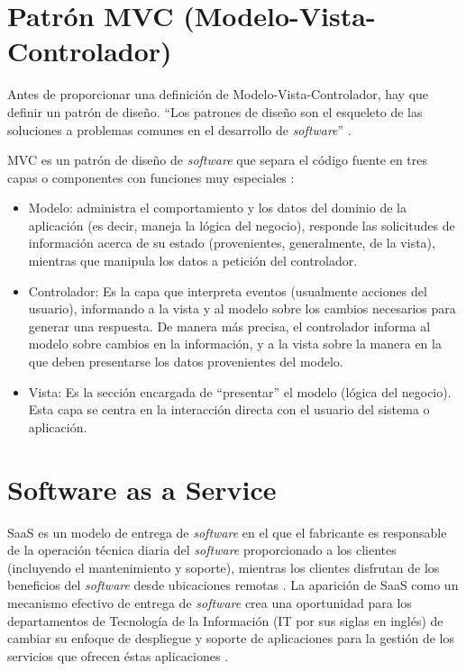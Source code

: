 \section{Patrón MVC (Modelo-Vista-Controlador)} \label{sect:Patron MVC}
Antes de proporcionar una definición de Modelo-Vista-Controlador, hay que definir un patrón de diseño. “Los patrones de diseño son el esqueleto de las soluciones a problemas comunes en el desarrollo de \textit{software}” \cite{MTMVC1}. 

MVC es un patrón de diseño de \textit{software} que separa el código fuente en tres capas o componentes con funciones muy especiales \cite{MTMVC2}: 
\begin{itemize}[noitemsep,nolistsep]
\item Modelo: administra el comportamiento y los datos del dominio de la aplicación (es decir, maneja la lógica del negocio), responde las solicitudes de información acerca de su estado (provenientes, generalmente, de la vista), mientras que manipula los datos a petición del controlador. 
\item Controlador: Es la capa que interpreta eventos (usualmente acciones del usuario), informando a la vista y al modelo sobre los cambios necesarios para generar una respuesta. De manera más precisa, el controlador informa al modelo sobre cambios en la información, y a la vista sobre la manera en la que deben presentarse los datos provenientes del modelo. 
\item Vista: Es la sección encargada de “presentar” el modelo (lógica del negocio). Esta capa se centra en la interacción directa con el usuario del sistema o aplicación. 
\end{itemize}

\section{Software as a Service} \label{sect:Software as a Service}

SaaS es un modelo de entrega de \textit{software} en el que el fabricante es responsable de la operación técnica diaria del \textit{software} proporcionado a los clientes (incluyendo el mantenimiento y soporte), mientras los clientes disfrutan de los beneficios del \textit{software} desde ubicaciones remotas \cite{MTSAAS}.
La aparición de SaaS como un mecanismo efectivo de entrega de \textit{software} crea una oportunidad para los departamentos de Tecnología de la Información (IT por sus siglas en inglés) de cambiar su enfoque de despliegue y soporte de aplicaciones para la gestión de los servicios que ofrecen éstas aplicaciones \cite{MTSAAS2}.


